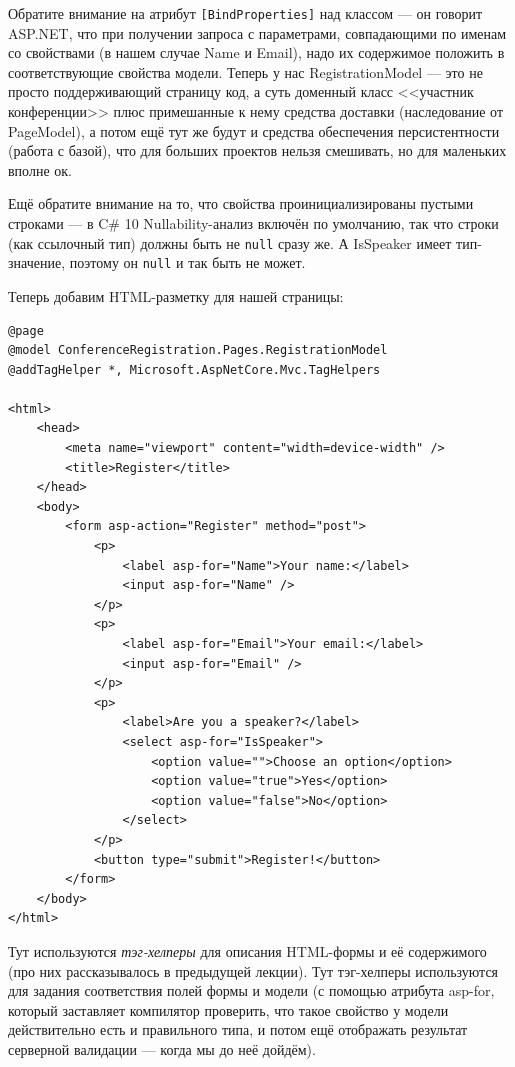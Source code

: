 \documentclass[a5paper]{article}
\begin{document}
Обратите внимание на атрибут \texttt{[BindProperties]} над классом --- он говорит ASP.NET, что при получении запроса с параметрами, совпадающими по именам со свойствами (в нашем случае Name и Email), надо их содержимое положить в соответствующие свойства модели. Теперь у нас RegistrationModel --- это не просто поддерживающий страницу код, а суть доменный класс <<участник конференции>> плюс примешанные к нему средства доставки (наследование от PageModel), а потом ещё тут же будут и средства обеспечения персистентности (работа с базой), что для больших проектов нельзя смешивать, но для маленьких вполне ок.

Ещё обратите внимание на то, что свойства проинициализированы пустыми строками --- в C\# 10 Nullability-анализ включён по умолчанию, так что строки (как ссылочный тип) должны быть не \texttt{null} сразу же. А IsSpeaker имеет тип-значение, поэтому он \texttt{null} и так быть не может.

Теперь добавим HTML-разметку для нашей страницы:

\begin{verbatim}
@page
@model ConferenceRegistration.Pages.RegistrationModel
@addTagHelper *, Microsoft.AspNetCore.Mvc.TagHelpers

<html>
    <head>
        <meta name="viewport" content="width=device-width" />
        <title>Register</title>
    </head>
    <body>
        <form asp-action="Register" method="post">
            <p>
                <label asp-for="Name">Your name:</label>
                <input asp-for="Name" />
            </p>
            <p>
                <label asp-for="Email">Your email:</label>
                <input asp-for="Email" />
            </p>
            <p>
                <label>Are you a speaker?</label>
                <select asp-for="IsSpeaker">
                    <option value="">Choose an option</option>
                    <option value="true">Yes</option>
                    <option value="false">No</option>
                </select>
            </p>
            <button type="submit">Register!</button>
        </form>
    </body>
</html>
\end{verbatim}

Тут используются \emph{тэг-хелперы} для описания HTML-формы и её содержимого (про них рассказывалось в предыдущей лекции). Тут тэг-хелперы используются для задания соответствия полей формы и модели (с помощью атрибута asp-for, который заставляет компилятор проверить, что такое свойство у модели действительно есть и правильного типа, и потом ещё отображать результат серверной валидации --- когда мы до неё дойдём).
\end{document}
